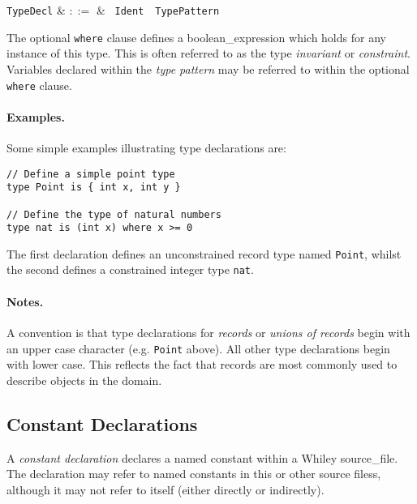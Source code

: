 \begin{syntax}
  \verb+TypeDecl+ & $::=$ & \ \verb+Ident+\ \
  \verb+TypePattern+\ \\
\end{syntax}

The optional \lstinline{where} clause defines a
\gls{boolean_expression} which holds for any instance of this type.
This is often referred to as the type {\em invariant} or {\em
  constraint}.  Variables declared within the {\em type pattern} may be
referred to within the optional \lstinline{where} clause.

\paragraph{Examples.}  Some simple examples illustrating type
declarations are:

\begin{lstlisting}
// Define a simple point type
type Point is { int x, int y }

// Define the type of natural numbers
type nat is (int x) where x >= 0
\end{lstlisting}

The first declaration defines an unconstrained record type named
\lstinline{Point}, whilst the second defines a constrained integer
type \lstinline{nat}.

\paragraph{Notes.}  A convention is that type declarations for {\em
  records} or {\em unions of records} begin with an upper case
character (e.g. \lstinline{Point} above).  All other type declarations
begin with lower case.  This reflects the fact that records are most
commonly used to describe objects in the domain.


\subsection{Constant Declarations}

A {\em constant declaration} declares a named constant within a Whiley
\gls{source_file}.  The declaration may refer to named constants in this
or other source filess, although it may not refer to itself (either
directly or indirectly).

